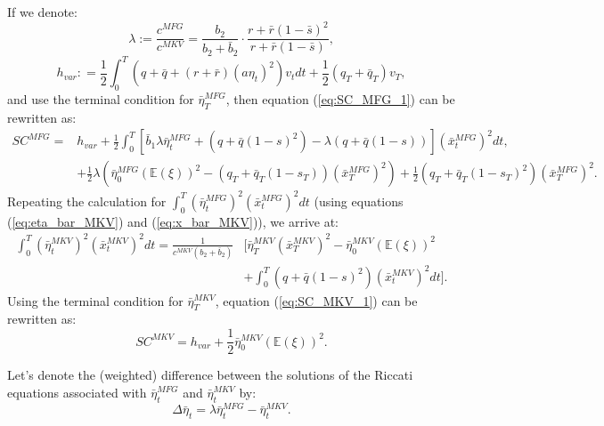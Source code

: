 \documentclass[11pt]{article}
\begin{document}
If we denote:
\begin{equation*}
\lambda := \frac{c^{MFG}}{c^{MKV}} = \frac{b_2}{b_2 + \bar{b}_2}\cdot \frac{ r + \bar{r}(1-\bar{s})^2 }{r + \bar{r}(1-\bar{s})},
\end{equation*}
\begin{equation*}
h_{var}: = \frac{1}{2}\int_0^T (q+\bar{q}+(r+\bar{r})(a\eta_t)^2)v_tdt + \frac{1}{2}(q_T+\bar{q}_T)v_T,
\end{equation*}
and use the terminal condition for $\bar{\eta}^{MFG}_T$, then equation (\ref{eq:SC_MFG_1}) can be rewritten as:
\begin{equation}
\begin{split}
SC^{MFG} = & h_{var} +  \frac{1}{2} \int_0^T \left[ \bar{b}_1 \lambda \bar{\eta}_t^{MFG} + (q+ \bar{q}(1-s)^2) - \lambda (q + \bar{q}(1-s)) \right] (\bar{x}_t^{MFG})^2 dt, \\
& + \frac{1}{2} \lambda \left( \bar{\eta}^{MFG}_0 (\mathbb{E}(\xi))^2 - (q_T+\bar{q}_T(1-s_T)) (\bar{x}_T^{MFG})^2 \right) + \frac{1}{2} (q_T+\bar{q}_T(1-s_T)^2)(\bar{x}_T^{MFG})^2.
\end{split}
\label{eq:SC_MFG_2}
\end{equation}
Repeating the calculation for $\int_0^T (\bar{\eta}^{MFG}_t)^2 (\bar{x}^{MFG}_t)^2 dt$ (using equations (\ref{eq:eta_bar_MKV}) and (\ref{eq:x_bar_MKV})), we arrive at:
\begin{equation*}
\begin{split}
\int_0^T (\bar{\eta}^{MKV}_t)^2 (\bar{x}^{MKV}_t)^2 dt=\frac{1}{c^{MKV}(b_2 + \bar{b}_2)} &\Bigg[ \bar{\eta}^{MKV}_T (\bar{x}^{MKV}_T)^2 - \bar{\eta}^{MKV}_0 (\mathbb{E}(\xi))^2 \\
&+ \int_0^T (q+\bar{q}(1-s)^2) (\bar{x}^{MKV}_t)^2 dt \Bigg].
\end{split}
\end{equation*}
Using the terminal condition for $\bar{\eta}^{MKV}_T$, equation (\ref{eq:SC_MKV_1}) can be rewritten as:
\begin{equation}
SC^{MKV} = h_{var} + \frac{1}{2} \bar{\eta}^{MKV}_0 (\mathbb{E}(\xi))^2.
\label{eq:SC_MKV_2}
\end{equation}

Let's denote the (weighted) difference between the solutions of the Riccati equations associated with $\bar{\eta}_t^{MFG}$ and $\bar{\eta}_t^{MKV}$ by:
\begin{equation}
	\Delta \bar{\eta}_t = \lambda \bar{\eta}_t^{MFG} - \bar{\eta}_t^{MKV} .
\label{eq:delta_eta}
\end{equation} 
\end{document}
